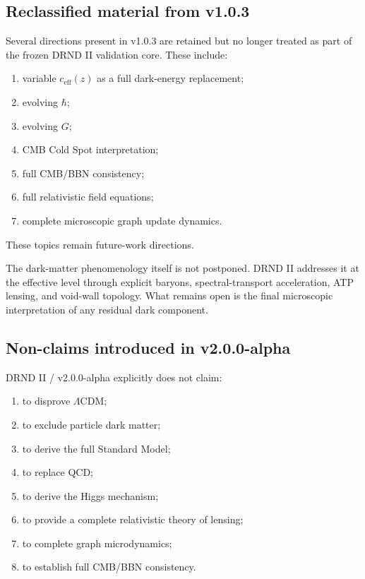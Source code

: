 \documentclass[12pt]{iopart}
\begin{document}
\subsection{Reclassified material from v1.0.3}

Several directions present in v1.0.3 are retained but no longer treated as part of the frozen DRND II validation core. These include:
\begin{enumerate}
    \item variable \(c_{\mathrm{eff}}(z)\) as a full dark-energy replacement;
    \item evolving \(\hbar\);
    \item evolving \(G\);
    \item CMB Cold Spot interpretation;
    \item full CMB/BBN consistency;
    \item full relativistic field equations;
    \item complete microscopic graph update dynamics.
\end{enumerate}
These topics remain future-work directions.

The dark-matter phenomenology itself is not postponed. DRND II addresses it at the effective level through explicit baryons, spectral-transport acceleration, ATP lensing, and void-wall topology. What remains open is the final microscopic interpretation of any residual dark component.

\subsection{Non-claims introduced in v2.0.0-alpha}

DRND II / v2.0.0-alpha explicitly does not claim:
\begin{enumerate}
    \item to disprove \(\Lambda\)CDM;
    \item to exclude particle dark matter;
    \item to derive the full Standard Model;
    \item to replace QCD;
    \item to derive the Higgs mechanism;
    \item to provide a complete relativistic theory of lensing;
    \item to complete graph microdynamics;
    \item to establish full CMB/BBN consistency.
\end{enumerate}
\end{document}
